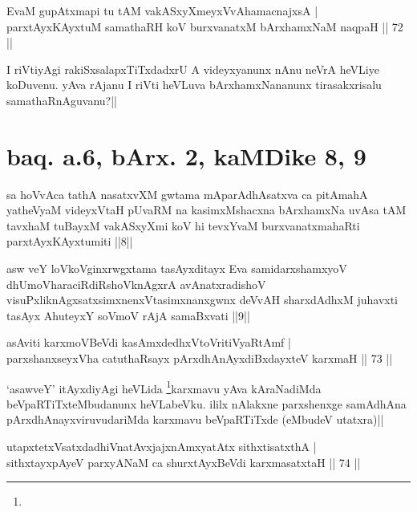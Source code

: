 \begin{shl}
EvaM gupAtxmapi tu tAM vakASxyXmeyxVvAhamacnajxsA | \\
parxtAyxKAyxtuM samathaRH koV burxvanatxM bArxhamxNaM naqpaH \hfill|| 72 || 
\end{shl}

\begin{artha}
I riVtiyAgi rakiSxsalapxTiTxdadxrU A videyxyanunx nAnu neVrA heVLiye 
koDuvenu. yAva rAjanu I riVti heVLuva bArxhamxNananunx tirasakxrisalu 
samathaRnAguvanu?||
\end{artha}

\section*{baq. a.6, bArx. 2, kaMDike 8, 9}

\begin{shl}
sa hoVvAca tathA nasatxvXM gwtama mAparAdhAsatxva ca pitAmahA yatheVyaM videyxVtaH pUvaRM na kasimxMshacxna bArxhamxNa uvAsa tAM tavxhaM tuBayxM vakASxyXmi koV hi tevxYvaM burxvanatxmahaRti parxtAyxKAyxtumiti ||8||
\end{shl}

\begin{shl}
asw veY loVkoV\s ginxrwgxtama tasAyxditayx Eva samidarxshamxyoV dhUmoV\s haraciRdiRshoV\s knAgxrA avAnatxradishoV visuPxliknAgxsatxsimxnenxVtasimxnanxgwnx deVvAH sharxdAdhxM juhavxti tasAyx AhuteyxY soVmoV rAjA samaBxvati ||9||
\end{shl}


\begin{shl}
asAviti karxmoV\s BeVdi kasAmxdedhxVtoVritiVyaRtAmf | \\
parxshanxseyxVha catuthaRsayx pArxdhAnAyxdiBxdayxteV karxmaH \hfill|| 73 || 
\end{shl}

\begin{artha}
`asawveY' itAyxdiyAgi heVLida \footnote[1]{}karxmavu yAva kAraNadiMda 
beVpaRTiTxteMbudanunx heVLabeVku. ililx nAlakxne parxshenxge samAdhAna 
pArxdhAnayxviruvudariMda karxmavu beVpaRTiTxde (eMbudeV utatxra)||
\end{artha}


\begin{shl}
utapxtetxVsatxdadhiVnatAvxjajxnAmxyatAtx sithxtisatxthA | \\
sithxtayxpAyeV parxyANaM ca shurxtAyx\s BeVdi karxmasatxtaH \hfill|| 74 || 
\end{shl}

